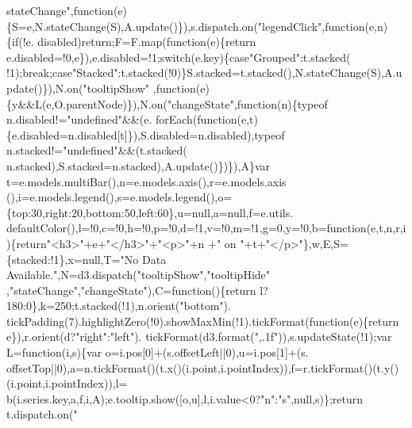 \begin{DoxyCode}
{      stateChange"},\textcolor{keyword}{function}(e)\{S=e,N.stateChange(S),A.update()\}),s.dispatch.on(\textcolor{stringliteral}{"legendClick"},\textcolor{keyword}{function}(e,n)\{\textcolor{keywordflow}{if}(!e.
      disabled)\textcolor{keywordflow}{return};F=F.map(\textcolor{keyword}{function}(e)\{return e.disabled=!0,e\}),e.disabled=!1;\textcolor{keywordflow}{switch}(e.key)\{\textcolor{keywordflow}{case}\textcolor{stringliteral}{"Grouped"}:t.stacked(
      !1);\textcolor{keywordflow}{break};\textcolor{keywordflow}{case}\textcolor{stringliteral}{"Stacked"}:t.stacked(!0)\}S.stacked=t.stacked(),N.stateChange(S),A.update()\}),N.on(\textcolor{stringliteral}{"tooltipShow"}
      ,\textcolor{keyword}{function}(e)\{y&&L(e,O.parentNode)\}),N.on(\textcolor{stringliteral}{"changeState"},\textcolor{keyword}{function}(n)\{typeof n.disabled!=\textcolor{stringliteral}{"undefined"}&&(e.
      forEach(\textcolor{keyword}{function}(e,t)\{e.disabled=n.disabled[t]\}),S.disabled=n.disabled),typeof n.stacked!=\textcolor{stringliteral}{"undefined"}&&(t.stacked(
      n.stacked),S.stacked=n.stacked),A.update()\})\}),A\}var t=e.models.multiBar(),n=e.models.axis(),r=e.models.axis
      (),i=e.models.legend(),s=e.models.legend(),o=\{top:30,right:20,bottom:50,left:60\},u=null,a=null,f=e.utils.
      defaultColor(),l=!0,c=!0,h=!0,p=!0,d=!1,v=!0,m=!1,g=0,y=!0,b=\textcolor{keyword}{function}(e,t,n,r,i)\{\textcolor{keywordflow}{return}\textcolor{stringliteral}{"<h3>"}+e+\textcolor{stringliteral}{"</h3>"}+\textcolor{stringliteral}{"<p>"}+n
      +\textcolor{stringliteral}{" on "}+t+\textcolor{stringliteral}{"</p>"}\},w,E,S=\{stacked:!1\},x=null,T=\textcolor{stringliteral}{"No Data Available."},N=d3.dispatch(\textcolor{stringliteral}{"tooltipShow"},\textcolor{stringliteral}{"tooltipHide"}
      ,\textcolor{stringliteral}{"stateChange"},\textcolor{stringliteral}{"changeState"}),C=\textcolor{keyword}{function}()\{\textcolor{keywordflow}{return} l?180:0\},k=250;t.stacked(!1),n.orient(\textcolor{stringliteral}{"bottom"}).
      tickPadding(7).highlightZero(!0).showMaxMin(!1).tickFormat(\textcolor{keyword}{function}(e)\{\textcolor{keywordflow}{return} e\}),r.orient(d?\textcolor{stringliteral}{"right"}:\textcolor{stringliteral}{"left"}).
      tickFormat(d3.format(\textcolor{stringliteral}{",.1f"})),s.updateState(!1);var L=\textcolor{keyword}{function}(i,s)\{var o=i.pos[0]+(s.offsetLeft||0),u=i.pos[1]+(s.
      offsetTop||0),a=n.tickFormat()(t.x()(i.point,i.pointIndex)),f=r.tickFormat()(t.y()(i.point,i.pointIndex)),l=
      b(i.series.key,a,f,i,A);e.tooltip.show([o,u],l,i.value<0?\textcolor{stringliteral}{"n"}:\textcolor{stringliteral}{"s"},null,s)\};\textcolor{keywordflow}{return} t.dispatch.on(\textcolor{stringliteral}{"
}
\end{DoxyCode}
